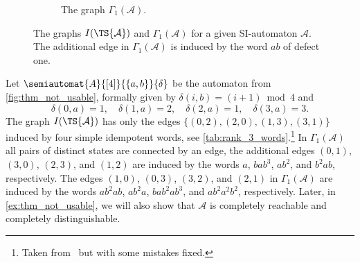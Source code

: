 \begin{example}
\begin{figure}[ht]
\begin{subfigure}[t]{0.325\textwidth}
			\caption{The graph $\Gamma_1(\mathcal A)$.}
		\end{subfigure}
		\caption[The graphs $I(\TS{\mathcal A})$ and $\Gamma_1(\mathcal A)$
		for a given SI-automaton $\mathcal A$]{The graphs $I(\TS{\mathcal A})$ and $\Gamma_1(\mathcal A)$
			for a given SI-automaton $\mathcal A$.
			The additional edge in $\Gamma_1(\mathcal A)$
			is induced by the word $ab$ of defect one.
		}
		\label{sync_max:fig:IAvsGamma}
	\end{figure}
\end{example}

\begin{example}
	\label{ex:I_vs_Gamma1}
	Let $\semiautomat{A}{[4]}{\{a,b\}}{\delta}$ be the automaton from \cref{fig:thm_not_usable},
	formally given by
	$\delta(i, b) = (i+1) \bmod 4$
	and %
	\[
	\delta(0, a) = 1, \quad \delta(1, a) = 2, \quad \delta(2, a) = 1, \quad \delta(3, a) = 3.
	\] 
	The graph $I(\TS{\mathcal A})$ has only the edges $\{ (0,2), (2,0), (1,3), (3,1)\}$
	induced by four simple idempotent words, see \cref{tab:rank_3_words}.\footnote{Taken from~\cite{DBLP:conf/lata/Hoffmann21a} but with some mistakes fixed.}
	In $\Gamma_1(\mathcal A)$
	all pairs of distinct states are connected by an edge,
	the additional edges $(0,1)$, $(3,0)$, $(2,3)$, and $(1,2)$
	are induced by the words $a$, $bab^3$, $ab^2$, and $b^2ab$, respectively. 
	The edges $(1,0)$, $(0,3)$, $(3,2)$, and $(2,1)$  in $\Gamma_1(\mathcal A)$
	are induced by the words $ab^2ab$, $ab^2a$, $bab^2ab^3$,
	and $ab^2a^2b^2$, respectively.
	Later, in \cref{ex:thm_not_usable}, we will also show that $\mathcal A$
	is completely reachable and completely distinguishable.
		

\end{example}
